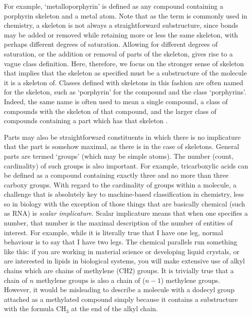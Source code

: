 \documentclass[10pt]{bmc_article}
\newenvironment{bmcformat}{\baselineskip20pt\sloppy\setboolean{publ}{false}}{\baselineskip20pt\sloppy}
\begin{document}
\begin{bmcformat}
For example, `metalloporphyrin' is defined as any compound containing a porphyrin skeleton and a metal atom.  Note that as the term is commonly used in chemistry, a skeleton is not always a straightforward substructure, since bonds may be added or removed while retaining more or less the same skeleton, with perhaps different degrees of saturation. Allowing for different degrees of saturation, or the addition or removal of parts of the skeleton, gives rise to a vague class definition. Here, therefore, we focus on the stronger sense of skeleton that implies that the skeleton as specified must be a substructure of the molecule it is a skeleton of. Classes defined with skeletons in this fashion are often named for the skeleton, such as `porphyrin' for the compound and the class `porphyrins'. Indeed, the same name is often used to mean a single compound, a class of compounds with the skeleton of that compound, and the larger class of compounds containing a part which has that skeleton \cite{corbett2008}. 

Parts may also be straightforward constituents in which there is no implicature that the part is somehow maximal, as there is in the case of skeletons.  General parts are termed `groups' (which may be simple atoms). The number (count, cardinality) of such groups is also important.  For example, tricarboxylic acids can be defined as a compound containing exactly three and no more than three carboxy groups.  With regard to the cardinality of groups within a molecule, a challenge that is absolutely key to machine-based classification in chemistry, less so in biology with the exception of those things that are basically chemical (such as RNA) is \textit{scalar implicature}. Scalar implicature means that when one specifies a number, that number is the maximal description of the number of entities of interest. For example, while it is literally true that I have one leg, normal behaviour is to say that I have two legs. The chemical parallels run something like this: if you are working in material science or developing liquid crystals, or are interested in lipids in biological systems, you will make extensive use of alkyl chains which are chains of methylene (CH2) groups.  It is trivially true that a chain of $n$ methylene groups is also a chain of ($n-1$) methylene groups.  However, it would be misleading to describe a molecule with a dodecyl group attached as a methylated compound simply because it contains a substructure with the formula CH$_3$ at the end of the alkyl chain. 



\end{bmcformat}
\end{document}
